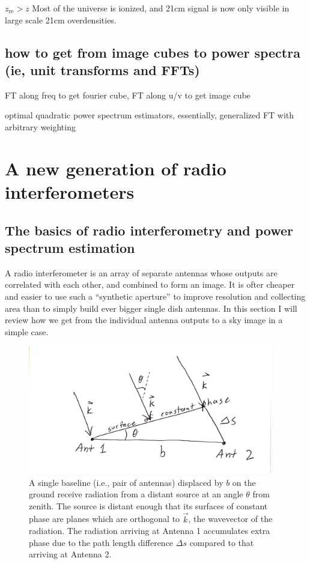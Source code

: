 $z_\text{re}>z$
Most of the universe is ionized, and 21cm signal is now only visible in large scale 21cm overdensities. 


\subsection{how to get from image cubes to power spectra (ie, unit transforms and FFTs)}

FT along freq to get fourier cube,
FT along u/v to get image cube 

optimal quadratic power spectrum estimators, essentially, generalized FT with arbitrary weighting


\section{A new generation of radio interferometers}

\subsection{The basics of radio interferometry and power spectrum estimation}

A radio interferometer is an array of separate antennas whose outputs are correlated with each other, and combined to form an image. It is ofter cheaper and easier to use such a ``synthetic aperture'' to improve resolution and collecting area than to simply build ever bigger single dish antennas. In this section I will review how we get from the individual antenna outputs to a sky image in a simple case.

\begin{figure}[h]
    \centering
    \includegraphics[width=0.95\textwidth]{chap0_intro/radio_interferometer_diagram.png}
    \caption[Diagram of a two element radio interferometer]{A single baseline (i.e., pair of antennas) displaced by $b$ on the ground receive radiation from a distant source at an angle $\theta$ from zenith. The source is distant enough that its surfaces of constant phase are planes which are orthogonal to $\vec{k}$, the wavevector of the radiation. The radiation arriving at Antenna 1 accumulates extra phase due to the path length difference $\Delta s$ compared to that arriving at Antenna 2.}
    \label{fig:radiointerferometerdiagram}
\end{figure}

